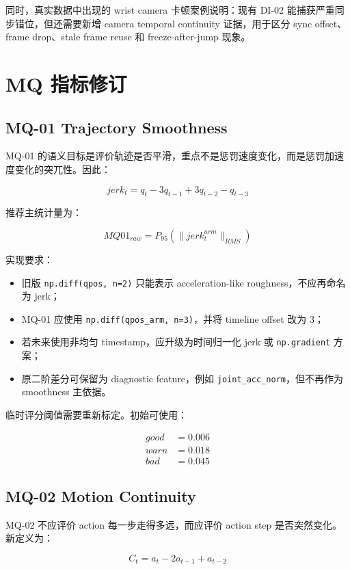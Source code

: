 \documentclass[UTF8,zihao=-4]{ctexart}
\newcommand{\Code}[1]{\texttt{#1}}
\begin{document}
同时，真实数据中出现的 wrist camera 卡顿案例说明：现有 DI-02 能捕获严重同步错位，但还需要新增 camera temporal continuity 证据，用于区分 sync offset、frame drop、stale frame reuse 和 freeze-after-jump 现象。

\section{MQ 指标修订}

\subsection{MQ-01 Trajectory Smoothness}

MQ-01 的语义目标是评价轨迹是否平滑，重点不是惩罚速度变化，而是惩罚加速度变化的突兀性。因此：

\[
jerk_t = q_t - 3q_{t-1} + 3q_{t-2} - q_{t-3}
\]

推荐主统计量为：

\[
MQ01_{raw}=P_{95}(\|jerk_t^{arm}\|_{RMS})
\]

实现要求：

\begin{itemize}
\item 旧版 \Code{np.diff(qpos, n=2)} 只能表示 acceleration-like roughness，不应再命名为 jerk；
\item MQ-01 应使用 \Code{np.diff(qpos\_arm, n=3)}，并将 timeline offset 改为 3；
\item 若未来使用非均匀 timestamp，应升级为时间归一化 jerk 或 \Code{np.gradient} 方案；
\item 原二阶差分可保留为 diagnostic feature，例如 \Code{joint\_acc\_norm}，但不再作为 smoothness 主依据。
\end{itemize}

临时评分阈值需要重新标定。初始可使用：

\[
\begin{aligned}
good &= 0.006\\
warn &= 0.018\\
bad &= 0.045
\end{aligned}
\]

\subsection{MQ-02 Motion Continuity}

MQ-02 不应评价 action 每一步走得多远，而应评价 action step 是否突然变化。新定义为：

\[
C_t=a_t-2a_{t-1}+a_{t-2}
\]
\end{document}
